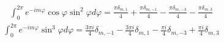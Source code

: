 %
\begin{equation} \begin{aligned} \label{eq:int_exp3}
\int_0^{2\pi} e^{-i m \varphi} \cos \varphi \sin^2 \varphi d \varphi = 
\frac{\pi \delta_{m,1} }{4} + \frac{\pi \delta_{m,-1} }{4} - 
\frac{\pi \delta_{m,-3} }{4} - \frac{\pi \delta_{m,3} }{4}
\end{aligned} \end{equation}
%
%
\begin{equation} \begin{aligned} \label{eq:int_exp4}
\int_{0}^{2\pi} e^{-i m \varphi} \sin^3 \varphi d \varphi = 
\frac{3 \pi i}{4} \delta_{m,-1} - \frac{3 \pi i}{4} \delta_{m,1} - 
\frac{\pi i}{4} \delta_{m,-3} + \frac{\pi i}{4} \delta_{m,3}
\end{aligned} \end{equation}
%
